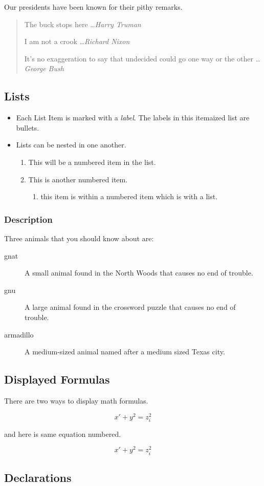 \documentclass[twocolumn,12pt]{article}
\begin{document}
Our presidents have been known for their pithy remarks.
\begin{quotation}
  The buck stops here \ldots \emph{Harry Truman}

  I am not a crook \ldots \emph{Richard Nixon}

  It's no exaggeration to say that undecided could go one way or the other \ldots \emph{George Bush}
\end{quotation}

\subsection{Lists}
\begin{itemize}
  \item Each List Item is marked with a \emph {label}. The labels in this itemaized list are bullets.
  \item Lists can be nested in one another.
    \begin {enumerate}
    \item This will be a numbered item in the list.
    \item This is another numbered item.
      \begin {enumerate}
      \item this item is within a numbered item which is with a list.
      \end{enumerate}
      
    \end {enumerate}
\end{itemize}

\subsubsection{Description}
Three animals that you should know about are:
\begin{description}
\item[gnat] A small animal found in the North Woods that causes no end of trouble.
\item[gnu] A large animal found in the crossword puzzle that causes no end of trouble.
\item[armadillo] A medium-sized animal named after a medium sized Texas city.
\end{description}

\subsection{Displayed Formulas}
There are two ways to display math formulas.

\[x' + y^{2} = z_{i} ^ {2}\]

and here is same equation numbered.

\begin{equation}
  x' + y^{2} = z_{i} ^ {2}
\end{equation}

\subsection{Declarations}
\end{document}
